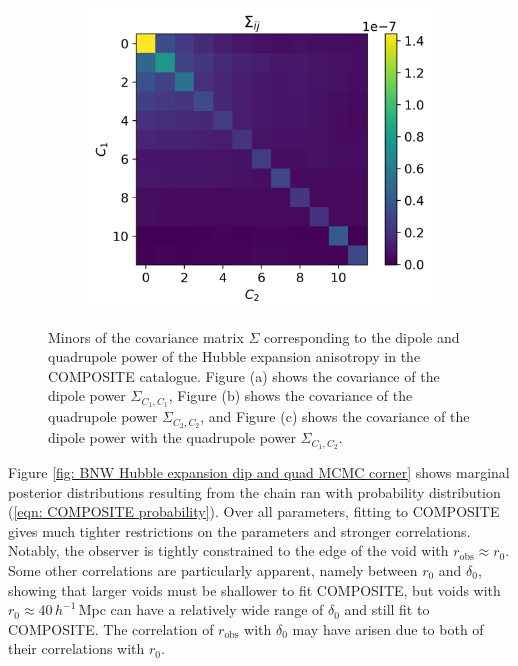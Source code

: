 \documentclass[a4paper,12pt]{report}
\begin{document}
\begin{figure}[t]
\begin{subfigure}[b]{0.3\textwidth}
        \caption{}
    \end{subfigure}
    \hfill
    \begin{subfigure}[b]{0.3\textwidth}
        \centering
        \includegraphics[width=\textwidth]{COMPOSITE cov/dip vs quad cov.png}
        \caption{}
    \end{subfigure}
    \caption{Minors of the covariance matrix $\Sigma$ corresponding to the dipole and quadrupole power of the Hubble expansion anisotropy in the COMPOSITE catalogue. Figure (a) shows the covariance of the dipole power $\Sigma_{C_1, C_1}$, Figure (b) shows the covariance of the quadrupole power $\Sigma_{C_2, C_2}$, and Figure (c) shows the covariance of the dipole power with the quadrupole power $\Sigma_{C_1, C_2}$.}
    \label{fig: COMPOSITE covariance minors}
\end{figure}

Figure \ref{fig: BNW Hubble expansion dip and quad MCMC corner} shows marginal posterior distributions resulting from the chain ran with probability distribution (\ref{eqn: COMPOSITE probability}). Over all parameters, fitting to COMPOSITE gives much tighter restrictions on the parameters and stronger correlations. Notably, the observer is tightly constrained to the edge of the void with $r_\text{obs} \approx r_0$. Some other correlations are particularly apparent, namely between $r_0$ and $\delta_0$, showing that larger voids must be shallower to fit COMPOSITE, but voids with $r_0 \approx 40\, h^{-1}\,$Mpc can have a relatively wide range of $\delta_0$ and still fit to COMPOSITE. The correlation of $r_\text{obs}$ with $\delta_0$ may have arisen due to both of their correlations with $r_0$.
\end{document}
